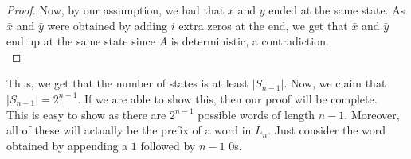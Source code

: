 \documentclass{article}
\begin{document}
\begin{enumerate}[label = \arabic*.]
\begin{proof}
		Now, by our assumption, we had that $x$ and $y$ ended at the same state. As $\bar{x}$ and $\bar{y}$ were obtained by adding $i$ extra zeros at the end, we get that $\bar{x}$ and $\bar{y}$ end up at the same state since $A$ is deterministic, a contradiction.\\
	\end{proof}
	Thus, we get that the number of states is at least $|S_{n-1}|.$ Now, we claim that $|S_{n-1}| = 2^{n-1}.$ If we are able to show this, then our proof will be complete.\\
	This is easy to show as there are $2^{n-1}$	possible words of length $n-1.$ Moreover, all of these will actually be the prefix of a word in $L_n.$ Just consider the word obtained by appending a $1$ followed by $n-1$ $0$s.
\end{enumerate}
\end{document}
